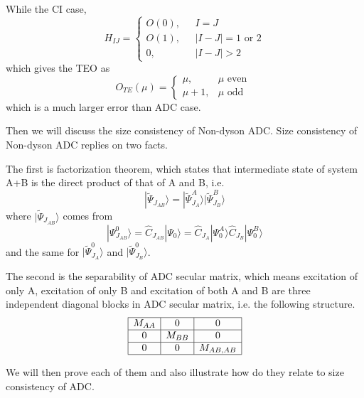 While the CI case, 
\begin{equation}
H_{IJ}=\left\{ 
\begin{array}{ll}
	O(0), & \text{ } I=J
	\\
	O(1), & \text{ } |I-J|=1 \text{ or } 2
	\\
	0,    & \text{ } |I-J|>2
\end{array}
\right.
\end{equation}
which gives the TEO as
\begin{equation}
	O_{T E}(\mu)=\left\{\begin{array}{ll}{\mu,} & {\mu \text { even }} \\ {\mu+1,} & {\mu \text { odd }}\end{array}\right.
\end{equation}
which is a much larger error than ADC case.

Then we will discuss the size consistency of Non-dyson ADC.
Size consistency of Non-dyson ADC replies on two facts.

The first is factorization theorem, which states that intermediate state of system A+B is the direct product of that of A and B, i.e.
\begin{equation}
	| \tilde{\Psi}_{J_{A B}} \rangle=| \tilde{\Psi}_{J_{A}}^{A} \rangle | \tilde{\Psi}_{J_{B}}^{B} \rangle
\end{equation}
where $| \tilde{\Psi}_{J_{A B}} \rangle$ comes from
\begin{equation}
	| \Psi_{J_{A B}}^{0} \rangle=\hat{C}_{J_{A B}} | \Psi_{0} \rangle=\hat{C}_{J_{A}} | \Psi_{0}^{A} \rangle \hat{C}_{J_{B}} | \Psi_{0}^{B} \rangle
\end{equation}
and the same for $| \tilde{\Psi}_{J_{A}}^{0} \rangle$ and $| \tilde{\Psi}_{J_{B}}^{0} \rangle$.

The second is the separability of ADC secular matrix, which means excitation of only A, excitation of only B and excitation of both A and B are three independent diagonal blocks in ADC secular matrix, i.e. the following structure.
\begin{equation}
	\begin{array}{|c|c|c|}
		\hline
		M_{AA} & 0 & 0
		\\
		\hline
		0 & M_{BB} & 0
		\\
		\hline
		0 & 0 & M_{AB,AB}
		\\
		\hline
	\end{array}
\end{equation}

We will then prove each of them and also illustrate how do they relate to size consistency of ADC.

